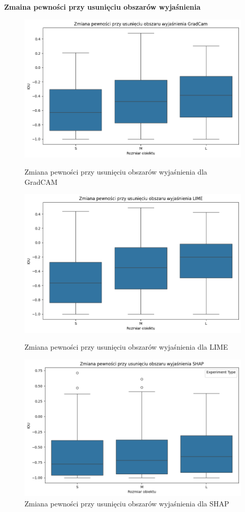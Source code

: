 \textbf{Zmaina pewności przy usunięciu obszarów wyjaśnienia}
\begin{figure}
	\centering
	\begin{minipage}[b]{0.3\textwidth}
		\centering\includegraphics[width=.9\textwidth]{img/size_confidence_mask_gradcam}
		\caption{Zmiana pewności przy usunięciu obszarów wyjaśnienia dla GradCAM}  \label{rys:size_confidence_mask_gradcam}
	\end{minipage}
	\begin{minipage}[b]{0.3\textwidth}
		\centering\includegraphics[width=.9\textwidth]{img/size_confidence_mask_lime}
		\caption{Zmiana pewności przy usunięciu obszarów wyjaśnienia dla LIME}  \label{rys:size_confidence_mask_lime}
	\end{minipage}
	\begin{minipage}[b]{0.3\textwidth}
		\centering\includegraphics[width=.9\textwidth]{img/size_confidence_mask_shap}
		\caption{Zmiana pewności przy usunięciu obszarów wyjaśnienia dla SHAP}  \label{rys:size_confidence_mask_shap}
	\end{minipage}
\end{figure}

